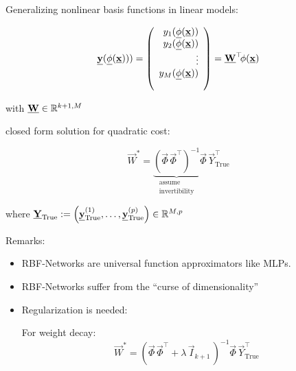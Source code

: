 \begin{frame}\frametitle{\subsecname}

Generalizing nonlinear basis functions in linear models:

\begin{equation}
\underline{\mathbf{y}}(\underline{\mathbf{\phi}}(\underline{\mathbf{x}}))) = 
\left( \begin{array}{rrrrrrrrrrrrrrrrrrrrrrrrrr} 
y_1(\underline{\mathbf{\phi}}(\underline{\mathbf{x}}))\\
y_2(\underline{\mathbf{\phi}}(\underline{\mathbf{x}}))\\
\vdots\\
y_M(\underline{\mathbf{\phi}}(\underline{\mathbf{x}}))\\
\\ \end{array} \right)
= \underline{\mathbf{W}}^\top \kern-.5ex \phi(\underline{\mathbf{x}})
\end{equation}

with $\underline{\mathbf{W}} \in \mathbb{R}^{k+1,M}$

closed form solution for quadratic cost: 

\begin{equation}
\vec W^{*} =
\underbrace{
\left(\vec \Phi \, \vec \Phi^{\top} \right)^{-1}
}_{
\substack{
\text{assume}\\ \text{invertibility}}
}
\vec \Phi \, \vec Y_{\text{True}}^{\top}
\end{equation}


\pause

where $\underline{\mathbf{Y}}_{\text{True}} := \left( \underline{\mathbf{y}}_{\text{True}}^{(1)},\ldots,\underline{\mathbf{y}}_{\text{True}}^{(p)}\right) \in \mathbb{R}^{M,p}$

\end{frame}

\begin{frame}
Remarks:

\begin{itemize}
\item RBF-Networks are universal function approximators like MLPs.
\item RBF-Networks suffer from the ``curse of dimensionality''
\item Regularization is needed:

For weight decay:
\begin{equation}
\vec W^{*} = \left( \vec \Phi \, \vec \Phi^{\top} + \lambda\,\vec I_{k+1} \,\right)^{-1} \vec \Phi \, \vec Y_{\text{True}}^{\top}
\end{equation}

\end{itemize}

\end{frame}


